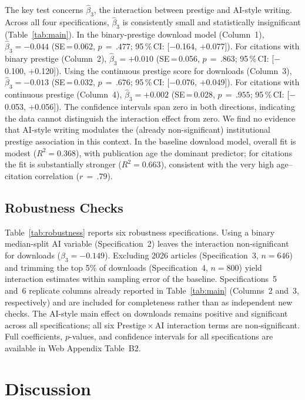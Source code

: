 \documentclass[12pt,a4paper]{article}
\begin{document}
The key test concerns $\hat{\beta}_3$, the interaction between prestige
and AI-style writing.
Across all four specifications, $\hat{\beta}_3$ is consistently small
and statistically insignificant (Table~\ref{tab:main}).
In the binary-prestige download model (Column~1),
$\hat{\beta}_3 = -0.044$ (SE\,=\,0.062, $p\,=\,.477$;
95\,\%\,CI: [$-$0.164, $+$0.077]).
For citations with binary prestige (Column~2),
$\hat{\beta}_3 = +0.010$ (SE\,=\,0.056, $p\,=\,.863$;
95\,\%\,CI: [$-$0.100, $+$0.120]).
Using the continuous prestige score for downloads (Column~3),
$\hat{\beta}_3 = -0.013$ (SE\,=\,0.032, $p\,=\,.676$;
95\,\%\,CI: [$-$0.076, $+$0.049]).
For citations with continuous prestige (Column~4),
$\hat{\beta}_3 = +0.002$ (SE\,=\,0.028, $p\,=\,.955$;
95\,\%\,CI: [$-$0.053, $+$0.056]).
The confidence intervals span zero in both directions,
indicating the data cannot distinguish the interaction effect from zero.
We find no evidence that AI-style writing modulates the (already
non-significant) institutional prestige association in this context.
In the baseline download model, overall fit is modest ($R^2 = 0.368$),
with publication age the dominant predictor; for citations the fit is
substantially stronger ($R^2 = 0.663$), consistent with the very high
age--citation correlation ($r\,=\,.79$).

\subsection{Robustness Checks}

Table~\ref{tab:robustness} reports six robustness specifications.
Using a binary median-split AI variable (Specification~2) leaves
the interaction non-significant for downloads
($\hat{\beta}_3 = -0.149$).
Excluding 2026 articles (Specification~3, $n = 646$) and trimming the
top 5\% of downloads (Specification~4, $n = 800$) yield interaction
estimates within sampling error of the baseline.
Specifications~5 and~6 replicate columns already reported in
Table~\ref{tab:main} (Columns~2 and~3, respectively) and are included
for completeness rather than as independent new checks.
The AI-style main effect on downloads remains positive and significant
across all specifications; all six Prestige\,$\times$\,AI interaction
terms are non-significant.
Full coefficients, $p$-values, and confidence intervals for all
specifications are available in Web Appendix Table~B2.

\section{Discussion}
\label{sec:discussion}
\end{document}
